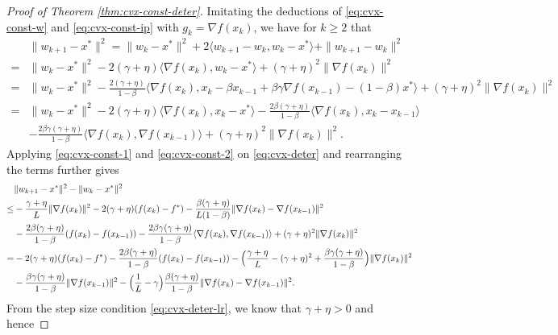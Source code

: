 \documentclass[10pt]{article}
\numberwithin{equation}{section}
\theoremstyle{definition}
\begin{document}
\begin{proof}[Proof of Theorem \ref{thm:cvx-const-deter}]
Imitating the deductions of \eqref{eq:cvx-const-w} and \eqref{eq:cvx-const-ip} with $g_k=\nabla f(x_k)$, we have for $k\ge 2$ that
\begin{equation}\label{eq:cvx-deter}
\begin{aligned}
& \|w_{k+1}-x^*\|^2=\|w_k-x^*\|^2+2\langle w_{k+1}-w_k, w_k-x^*\rangle+\|w_{k+1}-w_k\|^2\\
= & \|w_k-x^*\|^2-2(\gamma+\eta)\langle \nabla f(x_k), w_k-x^*\rangle +(\gamma+\eta)^2\|\nabla f(x_k)\|^2\\
= & \|w_k-x^*\|^2-\frac{2(\gamma+\eta)}{1-\beta}\langle \nabla f(x_k), x_k-\beta x_{k-1}+\beta \gamma \nabla f(x_{k-1})-(1-\beta) x^*\rangle +(\gamma+\eta)^2\|\nabla f(x_k)\|^2\\
 = & \|w_k-x^*\|^2-2(\gamma+\eta)\langle \nabla f(x_k), x_k-x^*\rangle -\frac{2\beta(\gamma+\eta)}{1-\beta}\langle \nabla f(x_k), x_k-x_{k-1}\rangle\\
 & - \frac{2\beta\gamma(\gamma+\eta)}{1-\beta}\langle \nabla f(x_k), \nabla f(x_{k-1})\rangle +(\gamma+\eta)^2\|\nabla f(x_k)\|^2.
\end{aligned}
\end{equation}
Applying \eqref{eq:cvx-const-1} and \eqref{eq:cvx-const-2} on \eqref{eq:cvx-deter} and rearranging the terms further gives
\begin{align}
    &\|w_{k+1}-x^*\|^2 - \|w_k-x^*\|^2 \notag\\
    \leq& - \frac{\gamma+\eta}{L}\|\nabla f(x_k)\|^2 - 2(\gamma+\eta)(f(x_k)-f^*)-\frac{\beta(\gamma+\eta)}{L(1-\beta)}\|\nabla f(x_k)-\nabla f(x_{k-1})\|^2\notag\\
    &- \frac{2 \beta(\gamma+\eta)}{1-\beta}(f(x_k)-f(x_{k-1}))- \frac{2\beta\gamma(\gamma+\eta)}{1-\beta}\langle \nabla f(x_k), \nabla f(x_{k-1})\rangle +(\gamma+\eta)^2\|\nabla f(x_k)\|^2\notag\\
    =&-2 (\gamma+\eta)(f(x_k)-f^*)-\frac{2 \beta(\gamma+\eta)}{1-\beta}(f(x_k)-f(x_{k-1})) -\Big(\frac{\gamma+\eta}{L}-(\gamma+\eta)^2+\frac{\beta \gamma(\gamma+\eta)}{1-\beta}\Big)\|\nabla f(x_k)\|^2\notag\\
    &-\frac{\beta \gamma(\gamma+\eta)}{1-\beta}\|\nabla f(x_{k-1})\|^2-\Big(\frac{1}{L}-\gamma\Big) \frac{\beta(\gamma+\eta)}{1-\beta} \|\nabla f(x_k)-\nabla f(x_{k-1})\|^2\label{eq:cvx-deter-1}.
\end{align}
%
%
%
%
%
%
From the step size condition \eqref{eq:cvx-deter-lr}, we know that $\gamma+\eta>0$ and hence

\end{proof}
\end{document}
